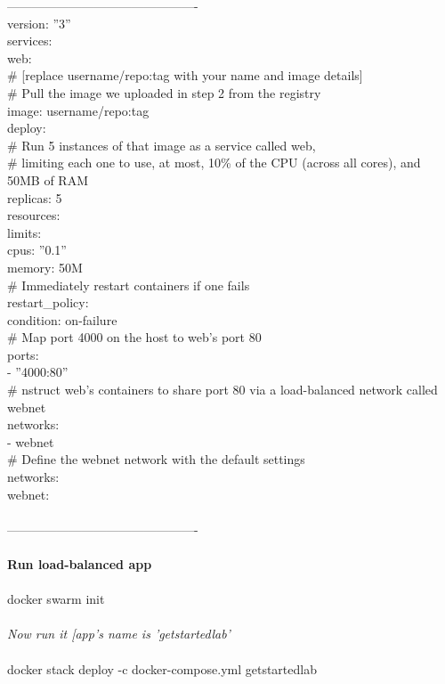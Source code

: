 \documentclass[10pt,a4paper]{article}
\begin{document}
{{{{{{{{{----------------------------------------------\\
version: ''3''\\
services:\\
  web:\\
    \# [replace username/repo:tag with your name and image details]\\
    \# Pull the image we uploaded in step 2 from the registry\\
    image: username/repo:tag\\
    deploy:\\
      \# Run 5 instances of that image as a service called web, \\
      \# limiting each one to use, at most, 10\% of the CPU (across all cores), and 50MB of RAM\\
      replicas: 5\\
      resources:\\
        limits:\\
          cpus: ''0.1''\\
          memory: 50M\\
      \# Immediately restart containers if one fails\\
      restart\_policy:\\
        condition: on-failure\\
    \# Map port 4000 on the host to web’s port 80\\
    ports:\\
	- ''4000:80''       \\
   \# nstruct web’s containers to share port 80 via a load-balanced network called webnet\\
    networks:\\
       - webnet\\
\# Define the webnet network with the default settings\\
networks:\\
  webnet:\\
\\
----------------------------------------------\\
\\
\textbf{Run load-balanced app}}{\large \\
\\
docker swarm init\\
\\
\textit{Now run it [app's name is 'getstartedlab'}}{\large \\
\\
docker stack deploy -c docker-compose.yml getstartedlab\\
}}}}}}}}}
\end{document}
